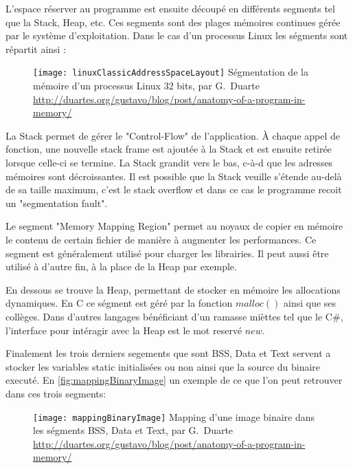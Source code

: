 L'espace réserver au programme est ensuite découpé en différents segments tel que la Stack, Heap, etc. Ces segments sont des plages mémoires continues gérée par le système d'exploitation. Dans le cas d'un processus Linux les ségments sont répartit ainsi :

\begin{figure}[H]
	\centering
	\texttt{[image: linuxClassicAddressSpaceLayout]}
	{Ségmentation de la mémoire d'un processus Linux 32 bits, par G.~Duarte}
	{\url{http://duartes.org/gustavo/blog/post/anatomy-of-a-program-in-memory/}}
	\label{fig:linuxClassicAddressSpaceLayout}
\end{figure}

La Stack permet de gérer le "Control-Flow" de l'application. À chaque appel de fonction, une nouvelle stack frame est ajoutée à la Stack et est ensuite retirée lorsque celle-ci se termine. La Stack grandit vers le bas, c-à-d que les adresses mémoires sont décroissantes. Il est possible que la Stack veuille s'étende au-delà de sa taille maximum, c'est le stack overflow et dans ce cas le programme recoit un "segmentation fault".

Le segment "Memory Mapping Region" permet au noyaux de copier en mémoire le contenu de certain fichier de manière à augmenter les performances. Ce segment est généralement utilisé pour charger les librairies. Il peut aussi être utilisé à d'autre fin, à la place de la Heap par exemple.

En dessous se trouve la Heap, permettant de stocker en mémoire les allocations dynamiques. En C ce ségment est géré par la fonction $malloc()$ ainsi que ses collèges. Dans d'autres langages bénéficiant d'un ramasse mièttes tel que le C\#, l'interface pour intéragir avec la Heap est le mot reservé $new$.

Finalement les trois derniers segements que sont BSS, Data et Text servent a stocker les variables static initialisées ou non ainsi que la source du binaire executé. En \autoref{fig:mappingBinaryImage} un exemple de ce que l'on peut retrouver dans ces trois segments:

\begin{figure}[H]
	\centering
	\texttt{[image: mappingBinaryImage]}
	{Mapping d'une image binaire dans les ségments BSS, Data et Text, par G.~Duarte}
	{\url{http://duartes.org/gustavo/blog/post/anatomy-of-a-program-in-memory/}}
	\label{fig:mappingBinaryImage}
\end{figure}

